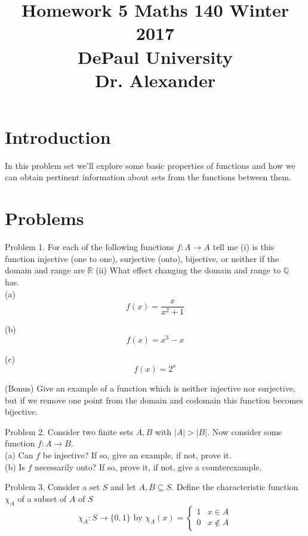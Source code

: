 \documentclass[16 pt]{amsart}
\theoremstyle{definition}
\theoremstyle{remark}
\numberwithin{equation}{subsection}
\newcommand{\R}{\mathbb{R}}
\newcommand{\Q}{\mathbb{Q}}
\begin{document}
\title{Homework 5 Maths 140 Winter 2017 \\ DePaul University\\Dr. Alexander}
\maketitle

\section{Introduction}
In this problem set we'll explore some basic properties of functions and how we can obtain pertinent information about sets from the functions between them.

\section{Problems}

Problem 1. For each of the following functions $f:A\rightarrow A$ tell me (i) is this function injective (one to one), surjective (onto), bijective, or neither if the domain and range are $\R$ (ii) What effect changing the domain and range to $\Q$ has.\\

(a) 
\[
f(x) = \frac{x}{x^2+1}
\]

(b)
\[
f(x) = x^3 - x
\]

(c) 
\[
f(x) = 2^x
\]

(Bonus) Give an example of a function which is neither injective nor surjective, but if we remove one point from the domain and codomain this function becomes bijective.

\newpage

Problem 2. Consider two finite sets $A,B$ with $|A|>|B|$.  Now consider some function $f:A\rightarrow B$.\\

(a) Can $f$ be injective?  If so, give an example, if not, prove it.\\

(b) Is $f$ necessarily onto?  If so, prove it, if not, give a counterexample.

\newpage

Problem 3. Consider a set $S$ and let $A,B\subseteq S$. Define the characteristic function $\chi_A$ of a subset of $A$ of $S$ 
\[
\chi_A : S\rightarrow \{0,1\} \text{ by } \chi_A(x) = \left\{\begin{array}{cc}1 & x\in A\\ 0 & x\notin A \end{array}\right.
\]   
\end{document}

